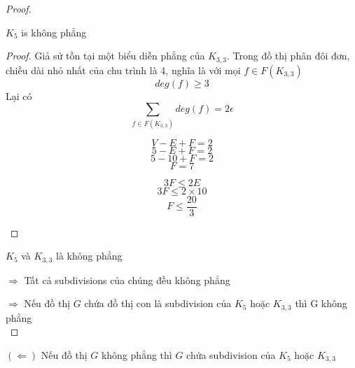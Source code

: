 \begin{proof}
    \begin{lemma}
        $K_5$ is không phẳng
    \end{lemma}
    \begin{proof}
        Giả sử tồn tại một biểu diễn phẳng của $K_{3,3}$. Trong đồ thị phân đôi đơn, chiều dài nhỏ nhất của chu trình là 4, nghĩa là với mọi $f \in F(K_{3,3})$
        $$deg(f) \geq 3$$
        Lại có $$\sum_{f \in F(K_{3,3})}deg(f) = 2\epsilon$$
        \begin{figure}[H]
            \begin{minipage}{0.3\textwidth}
                $$V-E+F=2$$
                $$5-E+F=2$$
                $$5-10+F=2$$
                $$F=7$$
            \end{minipage}
            \hfill
            \begin{minipage}{0.35\textwidth}
                \centering
            \end{minipage}
            \hfill
            \begin{minipage}{0.3\textwidth}
                \centering
                $$3F \leq 2E$$
                $$3F \leq 2 \times 10$$
                $$F \leq \frac{20}{3}$$
            \end{minipage}
        \end{figure}
    \end{proof}
    \begin{recap}
    \end{recap}
    $K_5$ và $K_{3,3}$ là không phẳng

    $\Rightarrow$ Tất cả subdivisions của chúng đều không phẳng

    $\Rightarrow$ Nếu đồ thị $G$ chứa đồ thị con là subdivision của $K_5$ hoặc $K_{3,3}$ thì G không phẳng \\

\end{proof}
$(\Leftarrow)$ Nếu đồ thị $G$ không phẳng thì $G$ chứa subdivision của $K_5$ hoặc $K_{3,3}$

